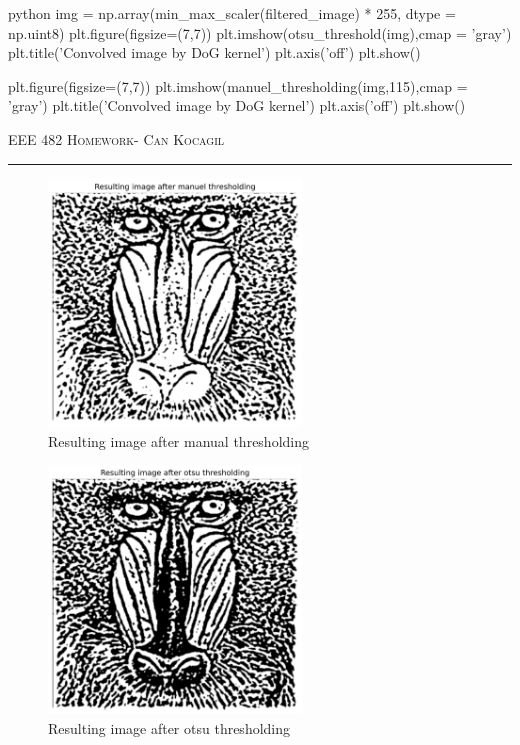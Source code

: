 \documentclass[12pt]{amsart}
\begin{document}
\begin{mintedbox}{python}
img = np.array(min_max_scaler(filtered_image) * 255, dtype = np.uint8)
plt.figure(figsize=(7,7))
plt.imshow(otsu_threshold(img),cmap = 'gray')
plt.title('Convolved image by DoG kernel')
plt.axis('off')
plt.show()

plt.figure(figsize=(7,7))
plt.imshow(manuel_thresholding(img,115),cmap = 'gray')
plt.title('Convolved image by DoG kernel')
plt.axis('off')
plt.show()
\end{mintedbox}


\newpage
{\scshape EEE 482} \hfill {\scshape \large  Homework-\relax} \hfill {\scshape Can Kocagil}
\smallskip
\hrule
\vspace{2mm}


\begin{figure}[h]
    \centering
    \includegraphics[width = 0.6\textwidth]{images/maneul_ths.png}
    \caption{Resulting image after manual thresholding}
\end{figure}


\begin{figure}[h]
    \centering
    \includegraphics[width = 0.6\textwidth]{images/otsul_ths.png}
    \caption{Resulting image after otsu thresholding}
\end{figure}
\end{document}
